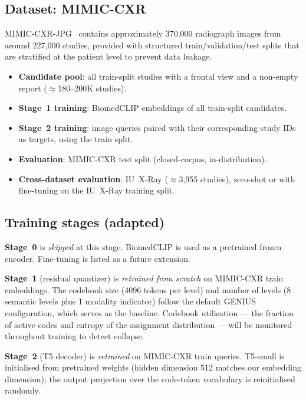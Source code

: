 \documentclass[11pt,a4paper]{article}
\begin{document}
\subsection{Dataset: MIMIC-CXR}

MIMIC-CXR-JPG~\cite{mimicjpg2019} contains approximately 370,000 radiograph
images from around 227,000 studies, provided with structured
train/validation/test splits that are stratified at the patient level to
prevent data leakage.

\begin{itemize}[itemsep=2pt]
    \item \textbf{Candidate pool}: all train-split studies with a frontal view
    and a non-empty report ($\approx$180--200K studies).
    \item \textbf{Stage~1 training}: BiomedCLIP embeddings of all train-split
    candidates.
    \item \textbf{Stage~2 training}: image queries paired with their
    corresponding study IDs as targets, using the train split.
    \item \textbf{Evaluation}: MIMIC-CXR test split (closed-corpus,
    in-distribution).
    \item \textbf{Cross-dataset evaluation}: IU~X-Ray ($\approx$3,955 studies),
    zero-shot or with fine-tuning on the IU~X-Ray training split.
\end{itemize}

\subsection{Training stages (adapted)}
\label{sec:stages}

\textbf{Stage~0} is \emph{skipped} at this stage.
BiomedCLIP is used as a pretrained frozen encoder.
Fine-tuning is listed as a future extension.

\textbf{Stage~1} (residual quantizer) is \emph{retrained from scratch} on
MIMIC-CXR train embeddings.
The codebook size (4096 tokens per level) and number of levels (8 semantic
levels plus 1 modality indicator) follow the default GENIUS configuration,
which serves as the baseline.
Codebook utilisation --- the fraction of active codes and entropy of the
assignment distribution --- will be monitored throughout training to detect
collapse.

\textbf{Stage~2} (T5 decoder) is \emph{retrained} on MIMIC-CXR train queries.
T5-small is initialised from pretrained weights (hidden dimension 512 matches
our embedding dimension); the output projection over the code-token vocabulary
is reinitialised randomly.
\end{document}
